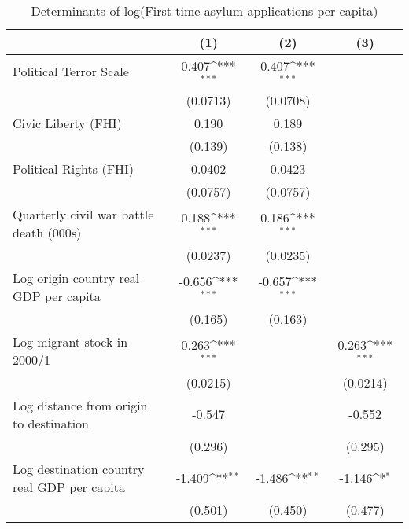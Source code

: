 \begin{table}[htbp]\centering
\def\sym#1{\ifmmode^{#1}\else\(^{#1}\)\fi}
\caption{Determinants of log(First time asylum applications per capita)}
\begin{tabular}{l*{3}{c}}
\hline\hline
                    &\multicolumn{1}{c}{(1)}         &\multicolumn{1}{c}{(2)}         &\multicolumn{1}{c}{(3)}         \\
\hline
Political Terror Scale&       0.407\sym{***}&       0.407\sym{***}&                     \\
                    &    (0.0713)         &    (0.0708)         &                     \\
[1em]
Civic Liberty (FHI) &       0.190         &       0.189         &                     \\
                    &     (0.139)         &     (0.138)         &                     \\
[1em]
Political Rights (FHI)&      0.0402         &      0.0423         &                     \\
                    &    (0.0757)         &    (0.0757)         &                     \\
[1em]
Quarterly civil war battle death (000s)&       0.188\sym{***}&       0.186\sym{***}&                     \\
                    &    (0.0237)         &    (0.0235)         &                     \\
[1em]
Log origin country real GDP per capita&      -0.656\sym{***}&      -0.657\sym{***}&                     \\
                    &     (0.165)         &     (0.163)         &                     \\
[1em]
Log migrant stock in 2000/1&       0.263\sym{***}&                     &       0.263\sym{***}\\
                    &    (0.0215)         &                     &    (0.0214)         \\
[1em]
Log distance from origin to destination&      -0.547         &                     &      -0.552         \\
                    &     (0.296)         &                     &     (0.295)         \\
[1em]
Log destination country real GDP per capita&      -1.409\sym{**} &      -1.486\sym{**} &      -1.146\sym{*}  \\
                    &     (0.501)         &     (0.450)         &     (0.477)         \\

\end{tabular}
\end{table}
